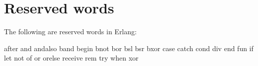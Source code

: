 \newpage
\section{Reserved words}


The following are reserved words in Erlang:

\begin{erlang}
after and andalso band begin bnot bor bsl bsr bxor case catch cond
div end fun if let not of or orelse receive rem try when xor
\end{erlang}
